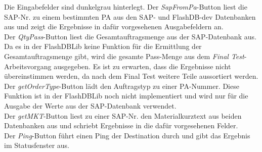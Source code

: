 Die Eingabefelder sind dunkelgrau hinterlegt. Der \textit{SapFromPa}-Button liest die SAP-Nr. zu einem bestimmten PA aus den SAP- und FlashDB-dev Datenbanken aus und zeigt die Ergebnisse in dafür vorgesehenen Ausgabefeldern an.\\
Der \textit{QtyPass}-Button liest die Gesamtauftragsmenge aus der SAP-Datenbank aus. Da es in der FlashDBLib keine Funktion für die Ermittlung der Gesamtauftragsmenge gibt, wird die gesamte Pass-Menge aus dem \textit{Final Test}-Arbeitsvorgang ausgegeben. Es ist zu erwarten, dass die Ergebnisse nicht übereinstimmen werden, da nach dem Final Test weitere Teile aussortiert werden.\\
Der \textit{getOrderType}-Button lädt den Auftragstyp zu einer PA-Nummer. Diese Funktion ist in der FlashDBLib noch nicht implementiert und wird nur für die Ausgabe der Werte aus der SAP-Datenbank verwendet.\\
Der \textit{getMKT}-Button liest zu einer SAP-Nr. den Materialkurztext aus beiden Datenbanken aus und schriebt Ergebnisse in die dafür vorgesehenen Felder.\\ 
Der \textit{Ping}-Button führt einen Ping der Destination durch und gibt das Ergebnis im Statusfenster aus. 


